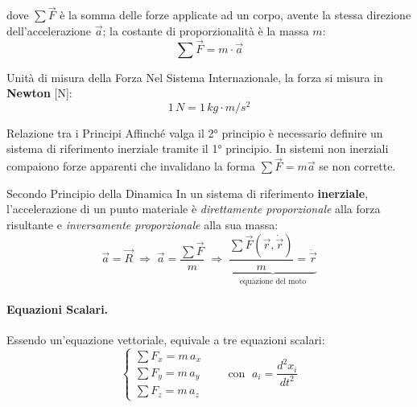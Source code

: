 \noindent
\begin{minipage}[t]{0.52\textwidth}
\vspace{0pt}
dove $\sum\vec{F}$ è la somma delle forze applicate
ad un corpo, avente la stessa direzione dell'accelerazione
$\vec{a}$; la costante di proporzionalità è la massa $m$:
\begin{equation}\label{eq:2nd_law}
    \boxed{\sum \vec{F} = m \cdot \vec{a}}
\end{equation}
\end{minipage}%
\hfill
\begin{minipage}[t]{0.44\textwidth}
\vspace{4pt}
\begin{osservazione}{Unità di misura della Forza}
Nel Sistema Internazionale, la forza si misura in \textbf{Newton} [N]:
\begin{equation}
    1 \, N = 1 \, kg \cdot m/s^2
\end{equation}
\end{osservazione}
\end{minipage}

\medskip
\begin{osservazione}{Relazione tra i Principi}
Affinché valga il 2° principio è necessario definire un sistema di riferimento inerziale tramite il 1° principio. In sistemi non inerziali compaiono forze apparenti che invalidano la forma $\sum \vec{F} = m\vec{a}$ se non corrette.
\end{osservazione}

\begin{definizione}{Secondo Principio della Dinamica}
In un sistema di riferimento \textbf{inerziale}, l'accelerazione di
un punto materiale è \emph{direttamente proporzionale} alla forza
risultante e \emph{inversamente proporzionale} alla sua massa:
\begin{equation}
    \vec{a} = \vec{R} \;\Longrightarrow\;
    \vec{a} = \frac{\sum\vec{F}}{m} \;\Longrightarrow\;
    \underbrace{\frac{\sum\vec{F}(\vec{r},\dot{\vec{r}})}{m}
               = \ddot{\vec{r}}}_{\text{equazione del moto}}
\end{equation}
\end{definizione}

\paragraph{Equazioni Scalari.}
Essendo un'equazione vettoriale, equivale a tre equazioni scalari:
\begin{equation}
    \begin{cases}
    \sum F_x = m\, a_x \\
    \sum F_y = m\, a_y \\
    \sum F_z = m\, a_z
\end{cases}
\qquad\text{con }\; a_i = \dfrac{d^2 x_i}{dt^2}
\end{equation}

